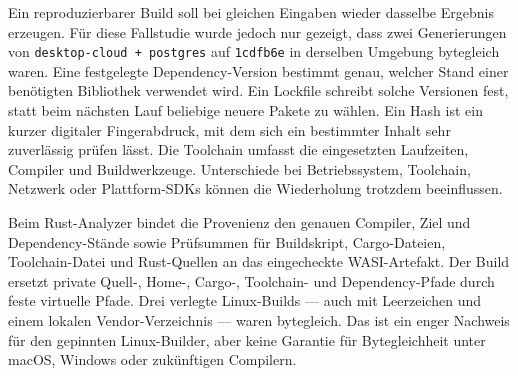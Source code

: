 \begin{beginnerstatement}

Ein reproduzierbarer Build soll bei gleichen Eingaben wieder dasselbe Ergebnis
erzeugen. Für diese Fallstudie wurde jedoch nur gezeigt, dass zwei
Generierungen von \texttt{desktop-cloud + postgres} auf
\texttt{1cdfb6e} in derselben Umgebung bytegleich waren. Eine festgelegte
Dependency-Version bestimmt genau, welcher Stand einer benötigten Bibliothek
verwendet wird. Ein Lockfile schreibt solche Versionen fest, statt beim
nächsten Lauf beliebige neuere Pakete zu wählen. Ein Hash ist ein kurzer
digitaler Fingerabdruck, mit dem sich ein bestimmter Inhalt sehr zuverlässig
prüfen lässt. Die Toolchain umfasst die eingesetzten Laufzeiten, Compiler und
Buildwerkzeuge. Unterschiede bei Betriebssystem, Toolchain, Netzwerk oder
Plattform-SDKs können die Wiederholung trotzdem beeinflussen.

Beim Rust-Analyzer bindet die Provenienz den genauen Compiler, Ziel und
Dependency-Stände sowie Prüfsummen für Buildskript, Cargo-Dateien,
Toolchain-Datei und Rust-Quellen an das eingecheckte WASI-Artefakt. Der Build
ersetzt private Quell-, Home-, Cargo-, Toolchain- und Dependency-Pfade durch
feste virtuelle Pfade. Drei verlegte Linux-Builds --- auch mit Leerzeichen und
einem lokalen Vendor-Verzeichnis --- waren bytegleich. Das ist ein enger
Nachweis für den gepinnten Linux-Builder, aber keine Garantie für Bytegleichheit
unter macOS, Windows oder zukünftigen Compilern.

\end{beginnerstatement}
